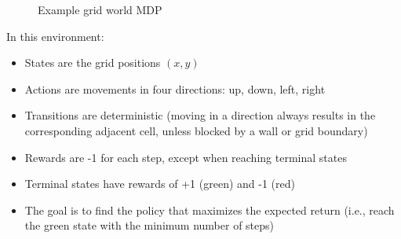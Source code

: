 \documentclass[12pt,a4paper]{article}
\begin{document}
\begin{figure}[H]
\centering
{}
\caption{Example grid world MDP}
\end{figure}

In this environment:
\begin{itemize}
    \item States are the grid positions $(x, y)$
    \item Actions are movements in four directions: up, down, left, right
    \item Transitions are deterministic (moving in a direction always results in the corresponding adjacent cell, unless blocked by a wall or grid boundary)
    \item Rewards are -1 for each step, except when reaching terminal states
    \item Terminal states have rewards of +1 (green) and -1 (red)
    \item The goal is to find the policy that maximizes the expected return (i.e., reach the green state with the minimum number of steps)
\end{itemize}
\end{document}
